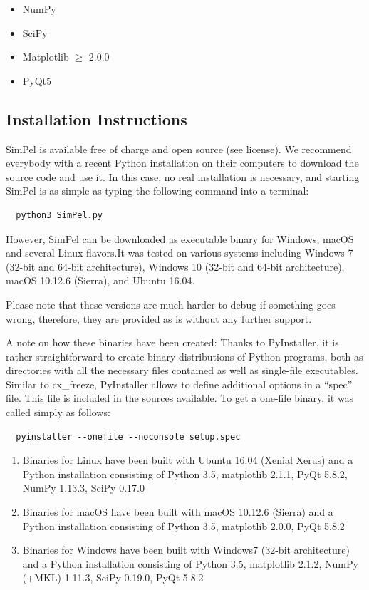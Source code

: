 \documentclass[pdftex,bezier,german,a4,twoside, headexclude,12pt,nochapterprefix, titlepage]{extarticle}
\newcommand{\simpel}{\textsf{SimPel}}
\begin{document}
\begin{itemize}
\item NumPy
\item SciPy
\item Matplotlib $\ge$ 2.0.0
\item PyQt5
\end{itemize}



\subsection{Installation Instructions}

\simpel{} is available free of charge and open source (see license). We recommend everybody with a recent Python installation on their computers to download the source code and use it. In this case, no real installation is necessary, and starting \simpel{} is as simple as typing the following command into a terminal:

\begin{verbatim}
  python3 SimPel.py
\end{verbatim}

However, \simpel{} can be downloaded as executable binary for Windows, macOS and several Linux flavors.It was tested on various systems including Windows 7 (32-bit and 64-bit architecture), Windows 10 (32-bit and 64-bit architecture), macOS 10.12.6 (Sierra), and Ubuntu 16.04.

Please note that these versions are much harder to debug if something goes wrong, therefore, they are provided as is without any further support. 


A note on how these binaries have been created: Thanks to PyInstaller, it is rather straightforward to create binary distributions of Python programs, both as directories with all the necessary files contained as well as single-file executables.  Similar to cx\_freeze, PyInstaller allows to define additional options in a ``spec'' file.  This file is included in the sources available. To get a one-file binary, it was called simply as follows:

\begin{verbatim}
  pyinstaller --onefile --noconsole setup.spec
\end{verbatim}

\begin{enumerate}
\item Binaries for Linux have been built with Ubuntu 16.04 (Xenial Xerus) and a Python installation consisting of Python 3.5, matplotlib 2.1.1, PyQt 5.8.2,  NumPy 1.13.3, SciPy 0.17.0

\item  Binaries for macOS have been built with macOS 10.12.6 (Sierra) and a Python installation consisting of Python 3.5, matplotlib 2.0.0, PyQt 5.8.2

 \item  Binaries for Windows have been built with Windows7 (32-bit architecture) and a Python installation consisting of Python 3.5, matplotlib 2.1.2, NumPy (+MKL) 1.11.3, SciPy 0.19.0, PyQt 5.8.2
\end{enumerate}
\end{document}
